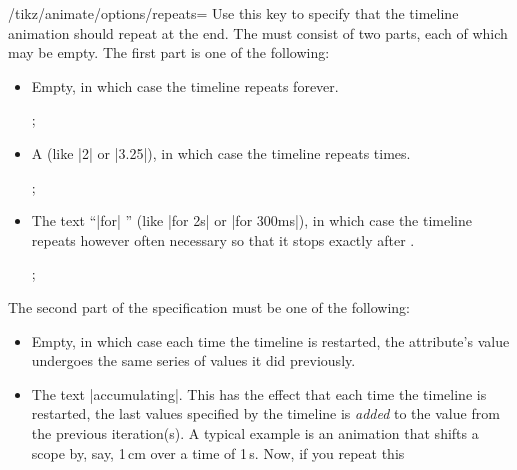 \begin{key}{/tikz/animate/options/repeats=}
  Use this key to specify that the timeline animation should repeat at
  the end. The  must consist of two parts, each of
  which may be empty. The first part is one of the following:
  \begin{itemize}
  \item Empty, in which case the timeline repeats forever.
\begin{codeexample}[animation list={1,2,3,4,5}]
\tikz 
  ; 
\end{codeexample}
  \item A  (like |2| or |3.25|), in which case the
    timeline repeats  times.
\begin{codeexample}[animation list={1,2,3,4,5}]
\tikz 
  ; 
\end{codeexample}
  \item The text ``|for| '' (like |for 2s| or |for 300ms|),
    in which case the timeline repeats however often necessary so that
    it  stops exactly after .
\begin{codeexample}[animation list={1,2,3,4,5}]
\tikz 
  ; 
\end{codeexample}
  \end{itemize}
  The second part of the specification must be one of the following:
  \begin{itemize}
  \item Empty, in which case each time the timeline is restarted, the
    attribute's value undergoes the same series of values it did
    previously.
  \item The text |accumulating|. This has the effect that each time
    the timeline is restarted, the last values specified by the
    timeline is \emph{added} to the value from the previous
    iteration(s). A typical example is an animation that shifts a
    scope by, say, 1\,cm over a time of 1\,s. Now, if you repeat this

\end{itemize}
\end{key}
